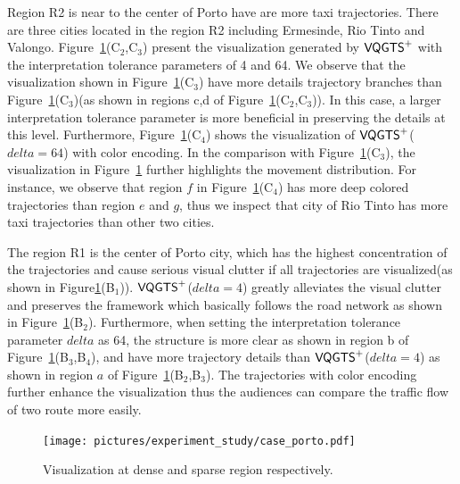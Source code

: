 Region R2 is near to the center of Porto have are more taxi trajectories. There are three cities located in the region R2 including Ermesinde, Rio Tinto and Valongo.  
Figure~\ref{fig:porto}(C$_2$,C$_3$) present the visualization generated by $\mathsf{VQGTS}^{+}$ with the interpretation tolerance parameters of 4 and 64. We observe that the visualization shown in Figure~\ref{fig:porto}(C$_3$) have more details trajectory branches than Figure~\ref{fig:porto}(C$_3$)(as shown in regions c,d of Figure~\ref{fig:porto}(C$_2$,C$_3$)). In this case, a larger interpretation tolerance parameter is more beneficial in preserving the details at this level. Furthermore, Figure~\ref{fig:porto}(C$_4$) shows the visualization of $\mathsf{VQGTS}^{+}$($delta = 64$) with color encoding. In the comparison with Figure~\ref{fig:porto}(C$_3$), the visualization in Figure~\ref{fig:porto} further highlights the movement distribution. 
For instance, we observe that region $f$ in Figure~\ref{fig:porto}(C$_4$) has more deep colored trajectories than region $e$ and $g$, thus we inspect that city of Rio Tinto has more taxi trajectories than other two cities.

The region R1 is the center of Porto city, which has the highest concentration of the trajectories and cause serious visual clutter if all trajectories are visualized(as shown in Figure\ref{fig:porto}(B$_1$)). $\mathsf{VQGTS}^{+}$($delta = 4$) greatly alleviates the visual clutter and preserves the framework which basically follows the road network as shown in Figure~\ref{fig:porto}(B$_2$). Furthermore, when setting the interpretation tolerance parameter $delta$ as 64, the structure is more clear as shown in region b of Figure~\ref{fig:porto}(B$_3$,B$_4$), and have more trajectory details than $\mathsf{VQGTS}^{+}$($delta = 4$) as shown in region $a$ of Figure~\ref{fig:porto}(B$_2$,B$_3$). The trajectories with color encoding further enhance the visualization thus the audiences can compare the traffic flow of two route more easily.   
 
 

\begin{figure}[t]
	\centering
	\vspace{2mm}
	\texttt{[image: pictures/experiment\_study/case\_porto.pdf]}
	\caption{Visualization at dense and sparse region respectively.}
	\vspace{0mm}
	\label{fig:porto}
\end{figure}

